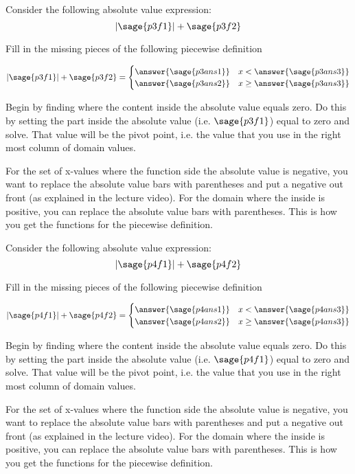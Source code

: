 \documentclass{ximera}
\begin{document}
\begin{problem}
    Consider the following absolute value expression:
    \[
        |\sage{p3f1}| + \sage{p3f2}
    \]
    
    Fill in the missing pieces of the following piecewise definition
    
    \[
        |\sage{p3f1}| + \sage{p3f2} = 
            \begin{cases}
                \answer{\sage{p3ans1}} & x < \answer{\sage{p3ans3}} \\
                \answer{\sage{p3ans2}} & x \geq \answer{\sage{p3ans3}}
            \end{cases}
    \]
    
    \begin{feedback}
        Begin by finding where the content inside the absolute value equals zero. Do this by setting the part inside the absolute value (i.e. $\sage{p3f1}$) equal to zero and solve. That value will be the pivot point, i.e. the value that you use in the right most column of domain values.
        
        For the set of x-values where the function side the absolute value is negative, you want to replace the absolute value bars with parentheses and put a negative out front (as explained in the lecture video). For the domain where the inside is positive, you can replace the absolute value bars with parentheses. This is how you get the functions for the piecewise definition.
    \end{feedback}
    
\end{problem}


\begin{problem}
    Consider the following absolute value expression:
    \[
        |\sage{p4f1}| + \sage{p4f2}
    \]
    
    Fill in the missing pieces of the following piecewise definition
    
    \[
        |\sage{p4f1}| + \sage{p4f2} = 
            \begin{cases}
                \answer{\sage{p4ans1}} & x < \answer{\sage{p4ans3}} \\
                \answer{\sage{p4ans2}} & x \geq \answer{\sage{p4ans3}}
            \end{cases}
    \]
    
    \begin{feedback}
        Begin by finding where the content inside the absolute value equals zero. Do this by setting the part inside the absolute value (i.e. $\sage{p4f1}$) equal to zero and solve. That value will be the pivot point, i.e. the value that you use in the right most column of domain values.
        
        For the set of x-values where the function side the absolute value is negative, you want to replace the absolute value bars with parentheses and put a negative out front (as explained in the lecture video). For the domain where the inside is positive, you can replace the absolute value bars with parentheses. This is how you get the functions for the piecewise definition.
    \end{feedback}
    
\end{problem}
\end{document}
